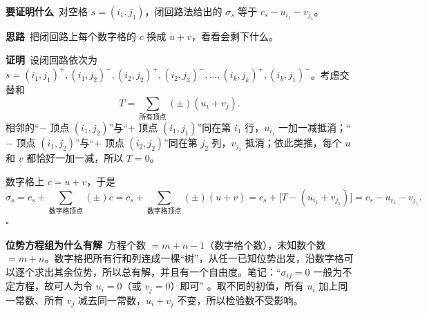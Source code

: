 \begin{proofbox}
\textbf{要证明什么}\ 对空格 $s=(i_1,j_1)$，闭回路法给出的 $\sigma_s$ 等于 $c_s-u_{i_1}-v_{j_1}$。\par
\textbf{思路}\ 把闭回路上每个数字格的 $c$ 换成 $u+v$，看看会剩下什么。\par
\textbf{证明}\ 设闭回路依次为 $s=(i_1,j_1)^+,(i_1,j_2)^-,(i_2,j_2)^+,(i_2,j_3)^-,\dots,(i_k,j_k)^+,(i_k,j_1)^-$。考虑交替和
\[
T=\sum_{\text{所有顶点}}(\pm)(u_i+v_j).
\]
相邻的“$-$ 顶点 $(i_1,j_2)$”与“$+$ 顶点 $(i_1,j_1)$”同在第 $i_1$ 行，$u_{i_1}$ 一加一减抵消；“$-$ 顶点 $(i_1,j_2)$”与“$+$ 顶点 $(i_2,j_2)$”同在第 $j_2$ 列，$v_{j_2}$ 抵消；依此类推，每个 $u$ 和 $v$ 都恰好一加一减，所以 $T=0$。\par
数字格上 $c=u+v$，于是
\[
\sigma_s=c_s+\sum_{\text{数字格顶点}}(\pm)c=c_s+\sum_{\text{数字格顶点}}(\pm)(u+v)=c_s+\bigl[T-(u_{i_1}+v_{j_1})\bigr]=c_s-u_{i_1}-v_{j_1}.
\]
\hfill$\square$\par
\textbf{位势方程组为什么有解}\ 方程个数 $=m+n-1$（数字格个数），未知数个数 $=m+n$。数字格把所有行和列连成一棵“树”，从任一已知位势出发，沿数字格可以逐个求出其余位势，所以总有解，并且有一个自由度。笔记：“$\sigma_{ij}=0$ 一般为不定方程，故可人为令 $u_i=0$（或 $v_j=0$）即可” \orig。取不同的初值，所有 $u_i$ 加上同一常数、所有 $v_j$ 减去同一常数，$u_i+v_j$ 不变，所以检验数不受影响。
\end{proofbox}

